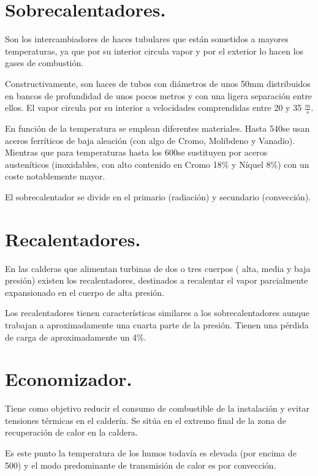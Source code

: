 \section{Sobrecalentadores.}
Son los intercambiadores de haces tubulares que están sometidos a mayores temperaturas,
ya que por su interior circula vapor  y por el
exterior lo hacen los gases de combustión.




Constructivamente, son haces de tubos con diámetros de unos 50mm distribuidos en bancos de profundidad de unos pocos metros y con una ligera separación entre ellos. El vapor circula por su interior a velocidades comprendidas entre 20 y 35 $\frac{m}{s}$.





En función de la temperatura se emplean diferentes materiales. Hasta 540\grado se usan aceros ferríticos de baja aleación (con algo de Cromo, Molibdeno y
Vanadio). Mientras que para temperaturas hasta los 600\grado se sustituyen por aceros austeníticos
(inoxidables, con alto contenido en Cromo 18\% y Níquel 8\%) con un coste notablemente
mayor.




El sobrecalentador se divide en el primario (radiación) y secundario (convección).


\section{Recalentadores.}
En las calderas que alimentan turbinas de dos o tres cuerpos ( alta, media y baja presión)
existen los recalentadores, destinados a recalentar el vapor parcialmente expansionado en el
cuerpo de alta presión.


Los recalentadores tienen características similares a los sobrecalentadores aunque trabajan a aproximadamente una cuarta parte de la presión. Tienen una pérdida de carga de aproximadamente un 4\%.

\section{Economizador.}
Tiene como objetivo reducir el consumo de combustible de la instalación y evitar tensiones térmicas en el calderín. Se sitúa en el extremo final de la zona de recuperación de calor en la caldera.


Es este punto la temperatura de los humos todavía es elevada (por encima de 500\grado) y el
modo predominante de transmisión de calor es por convección.

